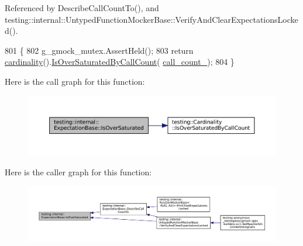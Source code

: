 Referenced by Describe\+Call\+Count\+To(), and testing\+::internal\+::\+Untyped\+Function\+Mocker\+Base\+::\+Verify\+And\+Clear\+Expectations\+Locked().


\begin{DoxyCode}
801                                                     \{
802     g\_gmock\_mutex.AssertHeld();
803     \textcolor{keywordflow}{return} \hyperlink{classtesting_1_1internal_1_1ExpectationBase_a1399efffbc8675510a15c6ba1f18184b}{cardinality}().\hyperlink{classtesting_1_1Cardinality_a9b6a55179f6dcc8fadec26e6d93f3e88}{IsOverSaturatedByCallCount}(
      \hyperlink{classtesting_1_1internal_1_1ExpectationBase_aea95d46f7583566e3f7a081b0668ad4c}{call\_count\_});
804   \}
\end{DoxyCode}
Here is the call graph for this function\+:
\nopagebreak
\begin{figure}[H]
\begin{center}
\leavevmode
\includegraphics[width=350pt]{classtesting_1_1internal_1_1ExpectationBase_a080dab35ecc6c57096f50758a0e8123d_cgraph}
\end{center}
\end{figure}
Here is the caller graph for this function\+:
\nopagebreak
\begin{figure}[H]
\begin{center}
\leavevmode
\includegraphics[width=350pt]{classtesting_1_1internal_1_1ExpectationBase_a080dab35ecc6c57096f50758a0e8123d_icgraph}
\end{center}
\end{figure}
\mbox{\label{classtesting_1_1internal_1_1ExpectationBase_ae629adc2dd9aee0ac62e50314f1a6449}} 
